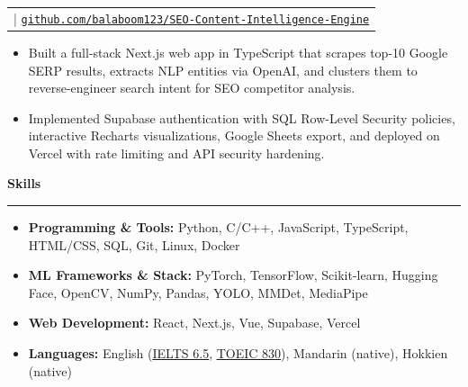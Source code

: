 \documentclass[10pt,a4paper]{article}
\makeatletter
\newcommand{\plainlink}[1]{\uline{\nolinkurl{#1}}}
\newcommand{\sectiontitle}[1]{%
  \vspace{5pt}
  {\large\textbf{#1}}\par
  \vspace{1.5pt}
  \hrule
  \vspace{2pt}
}
\newcommand{\projectentry}[2]{%
  \begin{tabularx}{\textwidth}{@{}>{\raggedright\arraybackslash}X@{}}
    {\small\textbf{#1}} \;|\; {\scriptsize #2}
  \end{tabularx}
  \par
}
\makeatother
\begin{document}
\vspace{3pt}
\projectentry
  {SEO Content Intelligence Engine}
  {\plainlink{github.com/balaboom123/SEO-Content-Intelligence-Engine}}
\begin{itemize}
  \item Built a full-stack Next.js web app in TypeScript that scrapes top-10 Google SERP results, extracts NLP entities via OpenAI, and clusters them to reverse-engineer search intent for SEO competitor analysis.
  \item Implemented Supabase authentication with SQL Row-Level Security policies, interactive Recharts visualizations, Google Sheets export, and deployed on Vercel with rate limiting and API security hardening.
\end{itemize}

\sectiontitle{Skills}
\footnotesize
\begin{itemize}
  \item \textbf{Programming \& Tools:} Python, C/C++, JavaScript, TypeScript, HTML/CSS, SQL, Git, Linux, Docker
  \item \textbf{ML Frameworks \& Stack:} PyTorch, TensorFlow, Scikit-learn, Hugging Face, OpenCV, NumPy, Pandas, YOLO, MMDet, MediaPipe
  \item \textbf{Web Development:} React, Next.js, Vue, Supabase, Vercel
  \item \textbf{Languages:} English (\href{https://github.com/balaboom123/balaboom123/blob/main/certifications/language/IELTS-2024-02-17.jpg}{\uline{IELTS 6.5}}, \href{https://github.com/balaboom123/balaboom123/blob/main/certifications/language/TOEIC-2023-07-27.jpg}{\uline{TOEIC 830}}), Mandarin (native), Hokkien (native)
\end{itemize}
\end{document}
